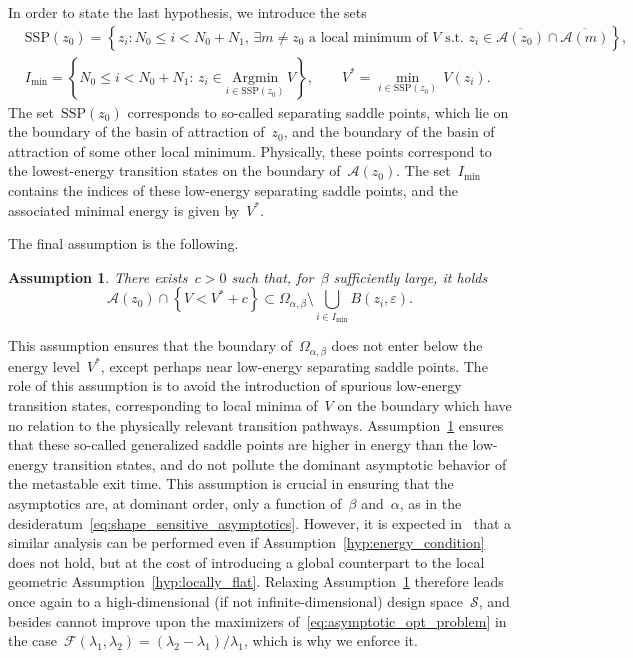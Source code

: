 \documentclass[a4]{article}
\newcommand{\1}{\mathbbm 1}
\newcommand{\basin}[1]{\mathcal A(#1)}
\newcommand{\Vstar}{V^*}
\newtheorem{hypothesis}{Assumption}
\begin{document}
        In order to state the last hypothesis, we introduce the sets 
        \begin{equation}
            \label{eq:low_energy_saddles}
            \begin{aligned}
                &\mathrm{SSP}(z_0) = \left\{z_i: N_0\leq i < N_0+N_1,\,\exists{m\neq z_0}\text{ a local minimum of }V\text{ s.t. } z_i\in \overline{\basin{z_0}}\cap\overline{\basin{m}}\right\},\\
                &I_{\min} = \left\{N_0\leq i < N_0+N_1:\, z_i\in\underset{i\in \mathrm{SSP}(z_0)}{\mathrm{Argmin}}\, V\right\},\qquad \Vstar = \underset{i\in \mathrm{SSP}(z_0)}{\min}\, V(z_i).
            \end{aligned}
        \end{equation}
        The set~$\mathrm{SSP}(z_0)$ corresponds to so-called separating saddle points, which lie on the boundary of the basin of attraction of~$z_0$, and the boundary of the basin of attraction of some other local minimum. Physically, these points correspond to the lowest-energy transition states on the boundary of~$\basin{z_0}$.
        The set~$I_{\min}$ contains the indices of these low-energy separating saddle points, and the associated minimal energy is given by~$\Vstar$.

        The final assumption is the following.
        \begin{hypothesis}
            \label{hyp:energy_condition}
            There exists~$c>0$ such that, for~$\beta$ sufficiently large, it holds
        \begin{equation}
            \basin{z_0}\cap \left\{V < \Vstar + c\right\}\subset \Omega_{\alpha,\beta} \setminus \bigcup_{i\in I_{\min}} B(z_i,\varepsilon).
        \end{equation}
        \end{hypothesis}
        This assumption ensures that the boundary of~$\Omega_{\alpha,\beta}$ does not enter below the energy level~$\Vstar$, except perhaps near low-energy separating saddle points. The role of this assumption is to avoid the introduction of spurious low-energy transition states, corresponding to local minima of~$V$ on the boundary which have no relation to the physically relevant transition pathways.
        Assumption~\ref{hyp:energy_condition} ensures that these so-called generalized saddle points are higher in energy than the low-energy transition states, and do not pollute the dominant asymptotic behavior of the metastable exit time. This assumption is crucial in ensuring that the asymptotics are, at dominant order, only a function of~$\beta$ and~$\alpha$, as in the desideratum~\eqref{eq:shape_sensitive_asymptotics}.
        However, it is expected in~\cite{BLS24} that a similar analysis can be performed even if Assumption~\eqref{hyp:energy_condition} does not hold, but at the cost of introducing a global counterpart to the local geometric Assumption~\eqref{hyp:locally_flat}. Relaxing Assumption~\ref{hyp:energy_condition} therefore leads once again to a high-dimensional (if not infinite-dimensional) design space~$\mathcal S$, and besides cannot improve upon the maximizers of~\eqref{eq:asymptotic_opt_problem} in the case~$\mathcal F(\lambda_1,\lambda_2)=(\lambda_2-\lambda_1)/\lambda_1$, which is why we enforce it.
\end{document}
